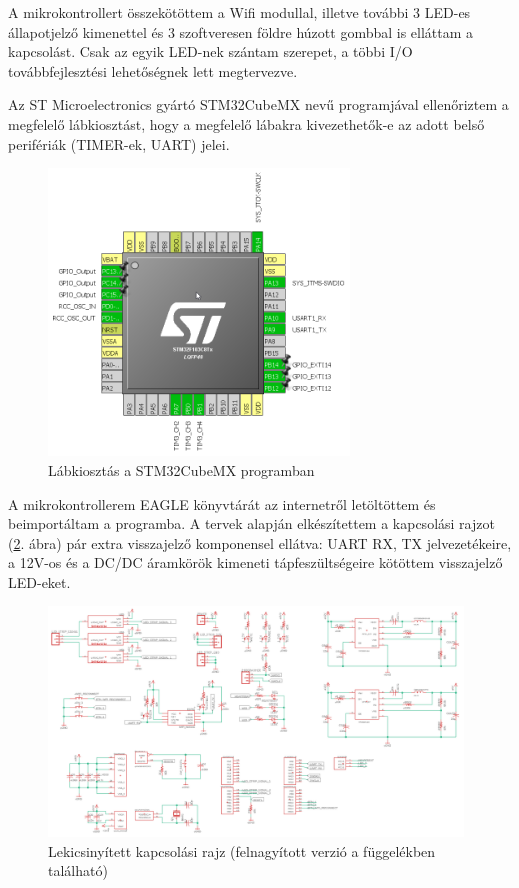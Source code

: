 \documentclass[../main.tex]{subfiles}
\begin{document}
            A mikrokontrollert összekötöttem a Wifi modullal, illetve további 3 LED-es állapotjelző kimenettel és 3 szoftveresen földre húzott gombbal is elláttam a kapcsolást. Csak az egyik LED-nek szántam szerepet, a többi I/O továbbfejlesztési lehetőségnek lett megtervezve.
            
            Az ST Microelectronics gyártó STM32CubeMX nevű programjával ellenőriztem a megfelelő lábkiosztást, hogy a megfelelő lábakra kivezethetők-e az adott belső perifériák (TIMER-ek, UART) jelei. 
            \begin{figure}[h!]
                \centering
                    \includegraphics[width=8cm]{resources/pcb_res/cubeMX_pinout.png}
                \caption{Lábkiosztás a STM32CubeMX programban}
                \label{fig:CubeMX_pinout}
            \end{figure}
            
            
            A mikrokontrollerem EAGLE könyvtárát az internetről letöltöttem és beimportáltam a programba. A tervek alapján elkészítettem a kapcsolási rajzot (\ref{fig:schematic_v02}. ábra) pár extra visszajelző komponensel ellátva: UART RX, TX jelvezetékeire, a 12V-os és a DC/DC áramkörök kimeneti tápfeszültségeire kötöttem visszajelző LED-eket. 
            
            \begin{figure}[h!]
                \centering
                    \includegraphics[width=11cm]{resources/pcb_res/schematic_v02.png}
                \caption{Lekicsinyített kapcsolási rajz (felnagyított verzió a függelékben található)}
                \label{fig:schematic_v02}
            \end{figure}
            
\end{document}
